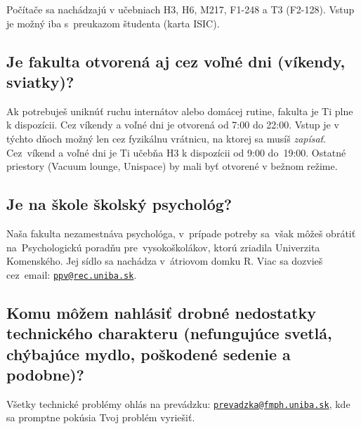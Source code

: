 Počítače sa nachádzajú v učebniach H3, H6, M217, F1-248 a T3 (F2-128).
Vstup je možný iba s~preukazom študenta (karta ISIC). 

\subsection*{Je fakulta otvorená aj cez voľné dni (víkendy, sviatky)?}

Ak potrebuješ uniknúť ruchu internátov alebo domácej rutine, fakulta je Ti plne k dispozícii. Cez víkendy a voľné dni je otvorená od 7:00 do 22:00. Vstup je v týchto dňoch možný len cez fyzikálnu vrátnicu, na ktorej sa musíš \emph{zapísať}. Cez~víkend a voľné dni je Ti učebňa H3 k dispozícii od 9:00 do~19:00. Ostatné priestory (Vacuum lounge, Unispace) by mali byť otvorené v bežnom režime.  

\subsection*{Je na škole školský psychológ?}

Naša fakulta nezamestnáva psychológa, v~prípade potreby sa~však môžeš obrátiť na~Psychologickú poradňu pre~vysokoškolákov, ktorú zriadila Univerzita Komenského. Jej sídlo sa nachádza v~átriovom domku R. Viac sa dozvieš cez~email: 
\href{mailto:ppv@rec.uniba.sk}{\texttt{ppv@rec.uniba.sk}}.

\subsection*{Komu môžem nahlásiť drobné nedostatky technického charakteru (nefungujúce
svetlá, chýbajúce mydlo, poškodené sedenie a podobne)?}

Všetky technické problémy ohlás na prevádzku: \newline \href{mailto:prevadzka@fmph.uniba.sk}{\texttt{prevadzka@fmph.uniba.sk}}, kde sa promptne pokúsia Tvoj problém vyriešiť. 
